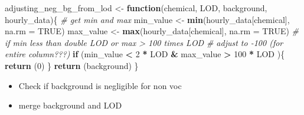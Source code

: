 \documentclass[
]{article}
\newenvironment{Shaded}{\begin{snugshade}}{\end{snugshade}}
\newcommand{\AttributeTok}[1]{\textcolor[rgb]{0.13,0.29,0.53}{#1}}
\newcommand{\CommentTok}[1]{\textcolor[rgb]{0.56,0.35,0.01}{\textit{#1}}}
\newcommand{\ConstantTok}[1]{\textcolor[rgb]{0.56,0.35,0.01}{#1}}
\newcommand{\ControlFlowTok}[1]{\textcolor[rgb]{0.13,0.29,0.53}{\textbf{#1}}}
\newcommand{\DecValTok}[1]{\textcolor[rgb]{0.00,0.00,0.81}{#1}}
\newcommand{\FunctionTok}[1]{\textcolor[rgb]{0.13,0.29,0.53}{\textbf{#1}}}
\newcommand{\NormalTok}[1]{#1}
\newcommand{\OtherTok}[1]{\textcolor[rgb]{0.56,0.35,0.01}{#1}}
\newcommand{\SpecialCharTok}[1]{\textcolor[rgb]{0.81,0.36,0.00}{\textbf{#1}}}
\providecommand{\tightlist}{%
  \setlength{\itemsep}{0pt}\setlength{\parskip}{0pt}}
\begin{document}
\begin{Shaded}
\begin{Highlighting}[]
\NormalTok{adjusting\_neg\_bg\_from\_lod }\OtherTok{\textless{}{-}} \ControlFlowTok{function}\NormalTok{(chemical, LOD, background, hourly\_data)\{ }
    \CommentTok{\# get min and max}
\NormalTok{    min\_value }\OtherTok{\textless{}{-}} \FunctionTok{min}\NormalTok{(hourly\_data[chemical], }\AttributeTok{na.rm =} \ConstantTok{TRUE}\NormalTok{)}
\NormalTok{    max\_value }\OtherTok{\textless{}{-}} \FunctionTok{max}\NormalTok{(hourly\_data[chemical], }\AttributeTok{na.rm =} \ConstantTok{TRUE}\NormalTok{)}
    \CommentTok{\# if min less than double LOD or max \textgreater{} 100 times LOD}
    \CommentTok{\# adjust to {-}100 (for entire column???)}
    \ControlFlowTok{if}\NormalTok{ (min\_value }\SpecialCharTok{\textless{}} \DecValTok{2} \SpecialCharTok{*}\NormalTok{ LOD }\SpecialCharTok{\&}\NormalTok{ max\_value }\SpecialCharTok{\textgreater{}} \DecValTok{100} \SpecialCharTok{*}\NormalTok{ LOD )\{}
      \FunctionTok{return}\NormalTok{ (}\DecValTok{0}\NormalTok{)}
\NormalTok{    \}}
  \FunctionTok{return}\NormalTok{ (background)}
\NormalTok{\}}
\end{Highlighting}
\end{Shaded}

\begin{itemize}
\tightlist
\item
  Check if background is negligible for non voc
\item
  merge background and LOD
\end{itemize}
\end{document}
